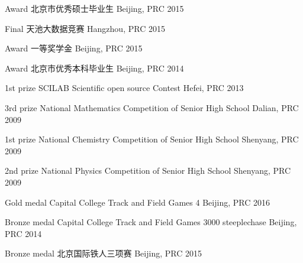 \begin{cvhonors}
\cvhonor
{Award} %
{北京市优秀硕士毕业生} %
{Beijing, PRC} %
{2015} %


\cvhonor
{Final} %
{天池大数据竞赛} %
{Hangzhou, PRC} %
{2015} %






\cvhonor
{Award} %
{一等奖学金} %
{Beijing, PRC} %
{2015} %


\cvhonor
{Award} %
{北京市优秀本科毕业生} %
{Beijing, PRC} %
{2014} %



\cvhonor
{1st prize} %
{SCILAB Scientific open source Contest} %
{Hefei, PRC} %
{2013} %


\cvhonor
{3rd prize} %
{National Mathematics Competition of Senior High School} %
{Dalian, PRC} %
{2009} %

\cvhonor
{1st prize} %
{National Chemistry Competition of Senior High School} %
{Shenyang, PRC} %
{2009} %

\cvhonor
{2nd prize} %
{National Physics Competition of Senior High School} %
{Shenyang, PRC} %
{2009} %

\cvhonor
{Gold medal} %
{Capital College Track and Field Games 4} %
{Beijing, PRC} %
{2016} %

\cvhonor
{Bronze medal} %
{Capital College Track and Field Games 3000 steeplechase} %
{Beijing, PRC} %
{2014} %

\cvhonor
{Bronze medal} %
{北京国际铁人三项赛} %
{Beijing, PRC} %
{2015} %


\end{cvhonors}
